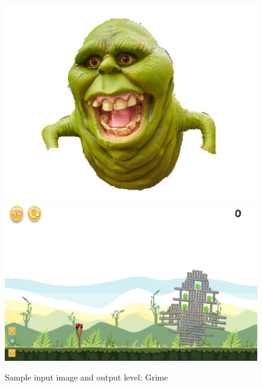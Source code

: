 \documentclass{dalthesis}
\begin{document}
\begin{figure}
	\caption{Sample input image and output level: Grime}
  \includegraphics[width=\textwidth,height=\textheight,keepaspectratio]{levels/pictures/halloween/grime.jpg}
  \includegraphics[width=\textwidth,height=\textheight,keepaspectratio]{levels/screenshots/halloween/grime.png}
\end{figure}
\end{document}
